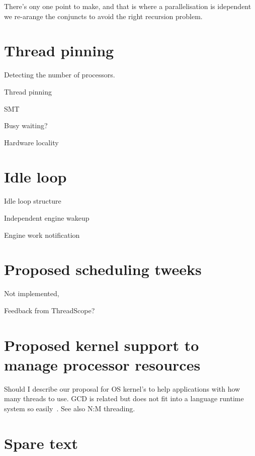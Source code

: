 
There's ony one point to make, and that is where a parallelisation is
idependent we re-arange the conjuncts to avoid the right recursion problem.

\section{Thread pinning}
\label{sec:thread_pinning}

Detecting the number of processors.

Thread pinning

SMT

Busy waiting?

Hardware locality

\section{Idle loop}
\label{sec:idle_loop}

Idle loop structure

Independent engine wakeup

Engine work notification

\section{Proposed scheduling tweeks}
\label{sec:proposed_tweeks}

Not implemented,

Feedback from ThreadScope?

\section{Proposed kernel support to manage processor resources}
\label{sec:kernel_scheduling_help}


Should I describe our proposal for OS kernel's to help
applications with how many threads to use.
GCD is related but does not fit into a language runtime system so
easily~\cite{apple_gcd}.
See also N:M threading.

\section{Spare text}

